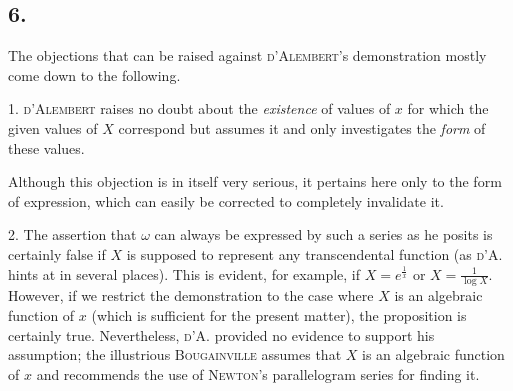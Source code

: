 \documentclass[12pt]{memoir}
\theoremstyle{plain}
\theoremstyle{remark}
\begin{document}
\subsection*{6.}

The objections that can be raised against \textsc{d'Alembert}'s demonstration mostly come down to the following.

1. \textsc{d'Alembert} raises no doubt about the \textit{existence} of values of \(x\) for which the given values of \(X\) correspond but assumes it and only investigates the \textit{form} of these values.

Although this objection is in itself very serious, it pertains here only to the form of expression, which can easily be corrected to completely invalidate it.

2. The assertion that \(\omega\) can always be expressed by such a series as he posits is certainly false if \(X\) is supposed to represent any transcendental function (as \textsc{d'A.} hints at in several places). This is evident, for example, if \(X = e^{\frac{1}{x}}\) or \(X = \frac{1}{\log X}\). However, if we restrict the demonstration to the case where \(X\) is an algebraic function of \(x\) (which is sufficient for the present matter), the proposition is certainly true. Nevertheless, \textsc{d'A.} provided no evidence to support his assumption; the illustrious \textsc{Bougainville} assumes that \(X\) is an algebraic function of \(x\) and recommends the use of \textsc{Newton}'s parallelogram series for finding it.
\end{document}
